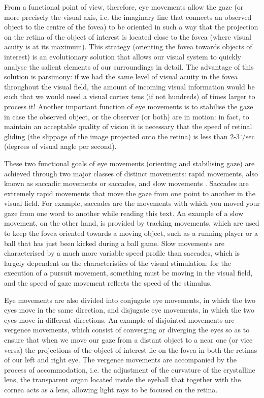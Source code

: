 \documentclass[11pt]{article}
\begin{document}
From a functional point of view, therefore, eye movements allow the gaze (or more precisely the visual axis, i.e. the imaginary line that connects an observed object to the centre of the fovea) to be oriented in such a way that the projection on the retina of the object of interest is located close to the fovea (where visual acuity is at its maximum). This strategy (orienting the fovea towards objects of interest) is an evolutionary solution that allows our visual system to quickly analyse the salient elements of our surroundings in detail. The advantage of this solution is parsimony: if we had the same level of visual acuity in the fovea throughout the visual field, the amount of incoming visual information would be such that we would need a visual cortex tens (if not hundreds) of times larger to process it! Another important function of eye movements is to stabilise the gaze in case the observed object, or the observer (or both) are in motion: in fact, to maintain an acceptable quality of vision it is necessary that the speed of retinal gliding (the slippage of the image projected onto the retina) is less than 2-3$^{\circ}$/sec (degrees of visual angle per second).

These two functional goals of eye movements (orienting and stabilising gaze) are achieved through two major classes of distinct movements: rapid movements, also known as saccadic movements or saccades, and slow movements \cite{Steinman1990}. Saccades are extremely rapid movements that move the gaze from one point to another in the visual field. For example, saccades are the movements with which you moved your gaze from one word to another while reading this text. An example of a slow movement, on the other hand, is provided by tracking movements, which are used to keep the fovea oriented towards a moving object, such as a running player or a ball that has just been kicked during a ball game. Slow movements are characterised by a much more variable speed profile than saccades, which is largely dependent on the characteristics of the visual stimulation: for the execution of a pursuit movement, something must be moving in the visual field, and the speed of gaze movement reflects the speed of the stimulus.

Eye movements are also divided into conjugate eye movements, in which the two eyes move in the same direction, and disjugate eye movements, in which the two eyes move in different directions. An example of disjointed movements are vergence movements, which consist of converging or diverging the eyes so as to ensure that when we move our gaze from a distant object to a near one (or vice versa) the projections of the object of interest lie on the fovea in both the retinas of our left and right eye. The vergence movements are accompanied by the process of accommodation, i.e. the adjustment of the curvature of the crystalline lens, the transparent organ located inside the eyeball that together with the cornea acts as a lens, allowing light rays to be focused on the retina.
\end{document}
